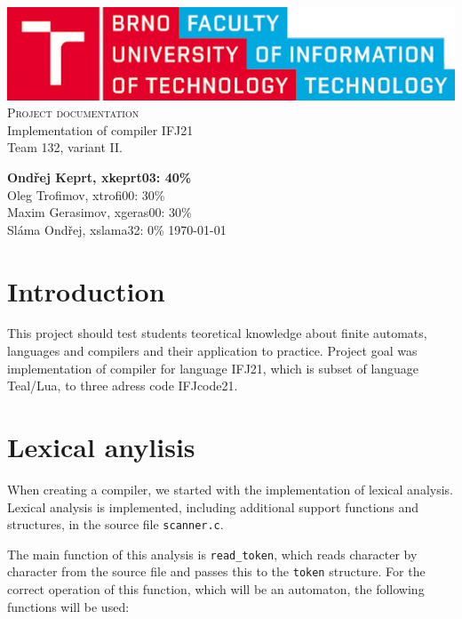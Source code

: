 \documentclass[11pt]{article}
\begin{document}
	\begin{titlepage}
		\begin{center}
		\includegraphics[width=0.77\linewidth]{pics/fitlogo.pdf} \\

        \textsc{\Huge Project documentation}\\
        \LARGE
            Implementation of compiler IFJ21    \\
            Team 132, variant II.
    \end{center}

    \noindent\textbf{Ondřej Keprt, xkeprt03: 40\%}\\
    Oleg Trofimov, xtrofi00: 30\%    \\
    Maxim Gerasimov, xgeras00: 30\%  \\
    Sláma Ondřej, xslama32: 0\%   \hfill    \today

\end{titlepage}

\newpage
\tableofcontents
\thispagestyle{empty}
\newpage
\setcounter{page}{1}


\section*{Introduction}
This project should test students teoretical knowledge about finite automats, languages and compilers and their application to practice. Project goal was implementation of compiler
for language IFJ21, which is subset of language Teal/Lua, to three adress code IFJcode21.

\section{Lexical anylisis}
When creating a compiler, we started with the implementation of lexical analysis. Lexical analysis is implemented, including additional support functions and structures, in the source file \texttt{scanner.c}. 

The main function of this analysis is \texttt {read\_token}, which reads character by character from the source file and passes this to the \texttt{token} structure. For the correct operation of this function, which will be an automaton, the following functions will be used:
    
\end{document}
